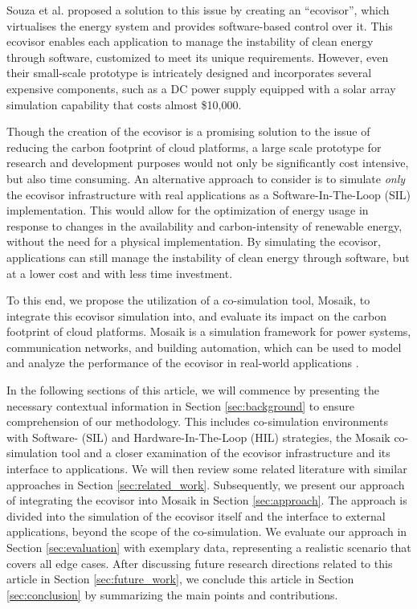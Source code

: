 Souza et al. \cite{souza2023} proposed a solution to this issue by creating an
\enquote{ecovisor}, which virtualises the energy system and provides
software-based control over it. This ecovisor enables each application to manage
the instability of clean energy through software, customized to meet its unique
requirements. However, even their small-scale prototype is intricately designed
and incorporates several expensive components, such as a DC power supply
equipped with a solar array simulation capability that costs almost \$10,000.

Though the creation of the ecovisor is a promising solution to the issue of
reducing the carbon footprint of cloud platforms, a large scale prototype for
research and development purposes would not only be significantly cost
intensive, but also time consuming. An alternative approach to consider is to
simulate \emph{only} the ecovisor infrastructure with real applications as a
Software-In-The-Loop (SIL) implementation. This would allow for the optimization
of energy usage in response to changes in the availability and carbon-intensity
of renewable energy, without the need for a physical implementation. By
simulating the ecovisor, applications can still manage the instability of clean
energy through software, but at a lower cost and with less time investment.

To this end, we propose the utilization of a co-simulation tool, Mosaik, to
integrate this ecovisor simulation into, and evaluate its impact on the carbon
footprint of cloud platforms. Mosaik is a simulation framework for power
systems, communication networks, and building automation, which can be used to
model and analyze the performance of the ecovisor in real-world applications
\cite{steinbrink2019}. \medskip

In the following sections of this article, we will commence by presenting the
necessary contextual information in Section \ref{sec:background} to ensure
comprehension of our methodology. This includes co-simulation environments with
Software- (SIL) and Hardware-In-The-Loop (HIL) strategies, the Mosaik
co-simulation tool and a closer examination of the ecovisor infrastructure and
its interface to applications. We will then review some related literature with
similar approaches in Section \ref{sec:related_work}. Subsequently, we present
our approach of integrating the ecovisor into Mosaik in Section
\ref{sec:approach}. The approach is divided into the simulation of the ecovisor
itself and the interface to external applications, beyond the scope of the
co-simulation. We evaluate our approach in Section \ref{sec:evaluation} with
exemplary data, representing a realistic scenario that covers all edge cases.
After discussing future research directions related to this article in Section
\ref{sec:future_work}, we conclude this article in Section \ref{sec:conclusion}
by summarizing the main points and contributions.
